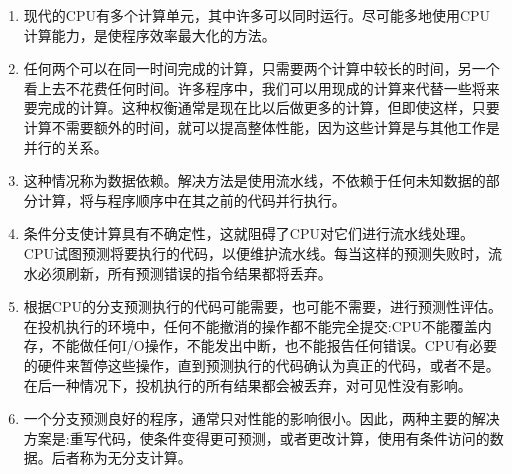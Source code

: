 \begin{enumerate}
\item 
现代的CPU有多个计算单元，其中许多可以同时运行。尽可能多地使用CPU计算能力，是使程序效率最大化的方法。

\item 
任何两个可以在同一时间完成的计算，只需要两个计算中较长的时间，另一个看上去不花费任何时间。许多程序中，我们可以用现成的计算来代替一些将来要完成的计算。这种权衡通常是现在比以后做更多的计算，但即使这样，只要计算不需要额外的时间，就可以提高整体性能，因为这些计算是与其他工作是并行的关系。

\item 
这种情况称为数据依赖。解决方法是使用流水线，不依赖于任何未知数据的部分计算，将与程序顺序中在其之前的代码并行执行。

\item
条件分支使计算具有不确定性，这就阻碍了CPU对它们进行流水线处理。CPU试图预测将要执行的代码，以便维护流水线。每当这样的预测失败时，流水必须刷新，所有预测错误的指令结果都将丢弃。

\item
根据CPU的分支预测执行的代码可能需要，也可能不需要，进行预测性评估。在投机执行的环境中，任何不能撤消的操作都不能完全提交:CPU不能覆盖内存，不能做任何I/O操作，不能发出中断，也不能报告任何错误。CPU有必要的硬件来暂停这些操作，直到预测执行的代码确认为真正的代码，或者不是。在后一种情况下，投机执行的所有结果都会被丢弃，对可见性没有影响。

\item 
一个分支预测良好的程序，通常只对性能的影响很小。因此，两种主要的解决方案是:重写代码，使条件变得更可预测，或者更改计算，使用有条件访问的数据。后者称为无分支计算。
	
\end{enumerate}